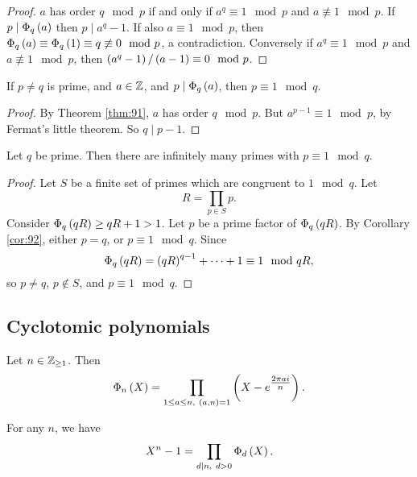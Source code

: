 \begin{proof}
$ a $ has order $ q \mod p $ if and only if $ a^q \equiv 1 \mod p $ and $ a \not\equiv 1 \mod p $. If $ p \mid \Phi_q\br{a} $ then $ p \mid a^q - 1 $. If also $ a \equiv 1 \mod p $, then $ \Phi_q\br{a} \equiv \Phi_q\br{1} \equiv q \not\equiv 0 \mod p $, a contradiction. Conversely if $ a^q \equiv 1 \mod p $ and $ a \not\equiv 1 \mod p $, then $ \br{a^q - 1} / \br{a - 1} \equiv 0 \mod p $.
\end{proof}


\begin{corollary}
\label{cor:92}
If $ p \ne q $ is prime, and $ a \in \mathbb{Z} $, and $ p \mid \Phi_q\br{a} $, then $ p \equiv 1 \mod q $.
\end{corollary}

\begin{proof}
By Theorem \ref{thm:91}, $ a $ has order $ q \mod p $. But $ a^{p - 1} \equiv 1 \mod p $, by Fermat's little theorem. So $ q \mid p - 1 $.
\end{proof}

\begin{theorem}
Let $ q $ be prime. Then there are infinitely many primes with $ p \equiv 1 \mod q $.
\end{theorem}

\begin{proof}
Let $ S $ be a finite set of primes which are congruent to $ 1 \mod q $. Let
$$ R = \prod_{p \in S} p. $$
Consider $ \Phi_q\br{qR} \ge qR + 1 > 1 $. Let $ p $ be a prime factor of $ \Phi_q\br{qR} $. By Corollary \ref{cor:92}, either $ p = q $, or $ p \equiv 1 \mod q $. Since
$$ \Phi_q\br{qR} = \br{qR}^{q - 1} + \dots + 1 \equiv 1 \mod qR, $$
so $ p \ne q $, $ p \notin S $, and $ p \equiv 1 \mod q $.
\end{proof}

\subsection{Cyclotomic polynomials}

\begin{definition}
Let $ n \in \mathbb{Z}_{\ge 1} $. Then
$$ \Phi_n\br{X} = \prod_{1 \le a \le n, \ \br{a, n} = 1} \br{X - e^{\tfrac{2\pi ai}{n}}}. $$
\end{definition}

\begin{lemma}
\label{lem:95}
For any $ n $, we have
$$ X^n - 1 = \prod_{d \mid n, \ d > 0} \Phi_d\br{X}. $$
\end{lemma}

